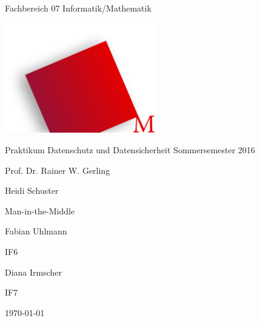	\begin{titlepage}
		\centering
		{\sffamily\huge Fachbereich 07 Informatik/Mathematik \par}
		\includegraphics[width=0.5\textwidth]{images/Hochschule_Muenchen_Logo.png}\par
		\vspace{1cm}
		{\sffamily\LARGE Praktikum Datenschutz und Datensicherheit Sommersemester 2016\par}
		\vspace{1cm}
		{\sffamily\Large Prof. Dr. Rainer W. Gerling\par}
		{\sffamily\Large Heidi Schuster\par}
		\vspace{2cm}
		{\LARGE Man-in-the-Middle\par}
		\vspace{1.5cm}
		{\LARGE Fabian Uhlmann\par}
		{\LARGE IF6\par}
		\vspace{0.5cm}
		{\LARGE Diana Irmscher\par}
		{\LARGE IF7\par}
		\vspace{1cm}
		{\large \today\par}
		\vfill
	\end{titlepage}